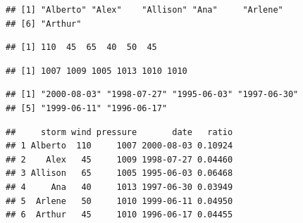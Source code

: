 \documentclass[]{book}
\newenvironment{Shaded}{\begin{snugshade}}{\end{snugshade}}
\newcommand{\StringTok}[1]{\textcolor[rgb]{0.31,0.60,0.02}{#1}}
\newcommand{\CommentTok}[1]{\textcolor[rgb]{0.56,0.35,0.01}{\textit{#1}}}
\newcommand{\OperatorTok}[1]{\textcolor[rgb]{0.81,0.36,0.00}{\textbf{#1}}}
\newcommand{\NormalTok}[1]{#1}
\begin{document}
\begin{verbatim}
## [1] "Alberto" "Alex"    "Allison" "Ana"     "Arlene" 
## [6] "Arthur"
\end{verbatim}

\begin{Shaded}
\end{Shaded}

\begin{verbatim}
## [1] 110  45  65  40  50  45
\end{verbatim}

\begin{Shaded}
\end{Shaded}

\begin{verbatim}
## [1] 1007 1009 1005 1013 1010 1010
\end{verbatim}

\begin{Shaded}
\end{Shaded}

\begin{verbatim}
## [1] "2000-08-03" "1998-07-27" "1995-06-03" "1997-06-30"
## [5] "1999-06-11" "1996-06-17"
\end{verbatim}

\begin{Shaded}
\end{Shaded}

\begin{verbatim}
##     storm wind pressure       date   ratio
## 1 Alberto  110     1007 2000-08-03 0.10924
## 2    Alex   45     1009 1998-07-27 0.04460
## 3 Allison   65     1005 1995-06-03 0.06468
## 4     Ana   40     1013 1997-06-30 0.03949
## 5  Arlene   50     1010 1999-06-11 0.04950
## 6  Arthur   45     1010 1996-06-17 0.04455
\end{verbatim}
\end{document}
